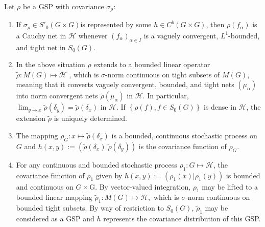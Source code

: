 \documentclass[graybox]{svmult}
\begin{document}
\begin{theorem}\label{ch18:the10}
Let $\rho $ be a GSP with covariance ${\sigma_{ \rho}}$:
\begin{enumerate}
\item[(a)] If $\sigma _{\rho} \in  S'_{0}(G\times G)
\text{is represented by some }
h \in  C^{b}(G\times G)$, then
 $\rho (f_{\alpha })$ is a Cauchy net in $\mathcal{H}$ whenever
$(f_{\alpha })_{\alpha \in I}$ is a vaguely convergent, $L^{1}$-bounded, and tight net in ${S_{0}(G)}$.

\item[(b)] In the above situation $\rho $ extends to
 a bounded linear operator
$\tilde{\rho}: M(G) \mapsto \mathcal{H}$ , which is $\sigma $-norm
continuous on tight subsets of $M(G)$, meaning that it converts
vaguely convergent, bounded, and  tight nets $(\mu_\alpha)$
into norm convergent nets $\tilde{\rho}(\mu_\alpha)$ in $\mathcal{H}$.
In particular,
$\lim_{y\rightarrow x} \tilde{\rho}(\delta _{y}) = \tilde{\rho}(\delta
_{x})$ in $\mathcal{H}$.  If $\left\{ \rho (f), f \in {S_{0}(G)} \right\} $ is dense in $\mathcal{H}$,
the extension $\tilde{\rho}$ is uniquely determined.

\item[(c)] The mapping $\rho_G \colon x \mapsto \tilde{\rho}(\delta_x)$ is a bounded, continuous stochastic process on $G$ and
$h(x,y) := (\tilde{\rho}(\delta_x) | \tilde{\rho}(\delta_y))$
is the covariance function of $\rho_G$.

\item[(d)] For any continuous and bounded stochastic process
 $\rho_{1}:G \mapsto  \mathcal{H}$,
the covariance function of $\rho _{1}  $ given by
$h(x,y) := (\rho_{1}(x)| \rho _{1}(y))$
is bounded and continuous on $G\times $G.  By vector-valued
integration, $\rho _{1}$ may be lifted to a bounded linear mapping
$\tilde{\rho}_{1}: M(G) \mapsto  \mathcal{H},$ which is $\sigma$-norm
continuous on bounded tight subsets. By
way of restriction to ${S_{0}(G)}$, $\tilde{\rho}_{1}$ may be considered
as a GSP  and $h$
represents the covariance distribution of this GSP.
\end{enumerate}
\end{theorem}
\end{document}
